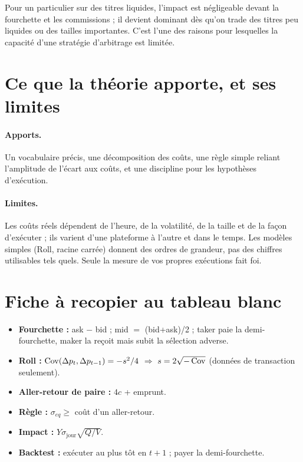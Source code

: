 Pour un particulier sur des titres liquides, l'impact est négligeable devant la fourchette et les commissions ; il devient dominant dès qu'on trade des titres peu liquides ou des tailles importantes. C'est l'une des raisons pour lesquelles la capacité d'une stratégie d'arbitrage est limitée.

\section{Ce que la théorie apporte, et ses limites}

\paragraph{Apports.} Un vocabulaire précis, une décomposition des coûts, une règle simple reliant l'amplitude de l'écart aux coûts, et une discipline pour les hypothèses d'exécution.

\paragraph{Limites.} Les coûts réels dépendent de l'heure, de la volatilité, de la taille et de la façon d'exécuter ; ils varient d'une plateforme à l'autre et dans le temps. Les modèles simples (Roll, racine carrée) donnent des ordres de grandeur, pas des chiffres utilisables tels quels. Seule la mesure de vos propres exécutions fait foi.

\section{Fiche à recopier au tableau blanc}

\begin{whiteboard}
\begin{itemize}[leftmargin=1.2em]
\item \textbf{Fourchette :} ask $-$ bid ; mid $=$ (bid+ask)/2 ; taker paie la demi-fourchette, maker la reçoit mais subit la sélection adverse.
\item \textbf{Roll :} $\operatorname{Cov}(\Delta p_t,\Delta p_{t-1}) = -s^2/4$ $\Rightarrow$ $s = 2\sqrt{-\operatorname{Cov}}$ (données de transaction seulement).
\item \textbf{Aller-retour de paire :} $4c$ + emprunt.
\item \textbf{Règle :} $\sigma_{eq}\ge$ coût d'un aller-retour.
\item \textbf{Impact :} $Y\sigma_{\text{jour}}\sqrt{Q/V}$.
\item \textbf{Backtest :} exécuter au plus tôt en $t+1$ ; payer la demi-fourchette.
\end{itemize}
\end{whiteboard}

